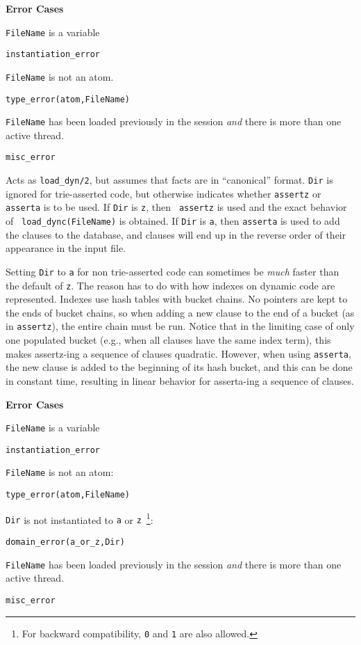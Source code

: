 \begin{description}
{\bf Error Cases}
\bi
\item 	{\tt FileName} is a variable
\bi
\item 	{\tt instantiation\_error}
\ei
\item 	{\tt FileName} is not an atom.
\bi
\item 	{\tt type\_error(atom,FileName)}
\ei
%
\item {\tt FileName} has been loaded previously in the session {\em and}
  there is more than one active thread.  
\bi
\item 	{\tt misc\_error}
\ei
\ei

 \label{load_dync/2}
    Acts as {\tt load\_dyn/2}, but assumes that facts are in
    ``canonical'' format.  {\tt Dir} is ignored for trie-asserted
    code, but otherwise indicates whether {\tt assertz} or {\tt
    asserta} is to be used.  If {\tt Dir} is {\tt z}, then {\tt
    assertz} is used and the exact behavior of {\tt
    load\_dync(FileName)} is obtained.  If {\tt Dir} is {\tt a}, then
    {\tt asserta} is used to add the clauses to the database, and
    clauses will end up in the reverse order of their appearance in
    the input file.  

    Setting {\tt Dir} to {\tt a} for non trie-asserted code can
    sometimes be {\em much} faster than the default of {\tt z}.  The
    reason has to do with how indexes on dynamic code are represented.
    Indexes use hash tables with bucket chains.  No pointers are kept
    to the ends of bucket chains, so when adding a new clause to the
    end of a bucket (as in {\tt assertz}), the entire chain must be
    run.  Notice that in the limiting case of only one populated
    bucket (e.g., when all clauses have the same index term), this
    makes assertz-ing a sequence of clauses quadratic.  However, when
    using {\tt asserta}, the new clause is added to the beginning of
    its hash bucket, and this can be done in constant time, resulting
    in linear behavior for asserta-ing a sequence of clauses.

{\bf Error Cases}
\bi
\item 	{\tt FileName} is a variable
\bi
\item 	{\tt instantiation\_error}
\ei
\item 	{\tt FileName} is not an atom:
\bi
\item 	{\tt type\_error(atom,FileName)}
\ei
%
\item 	{\tt Dir} is not instantiated to {\tt a} or {\tt z}~\footnote{For
backward compatibility, {\tt 0} and {\tt 1} are also allowed.}: 
\bi
\item 	{\tt domain\_error(a\_or\_z,Dir)}
\ei
%
\item {\tt FileName} has been loaded previously in the session {\em and}
  there is more than one active thread.  
\bi
\item 	{\tt misc\_error}
\ei
\ei


\end{description}
